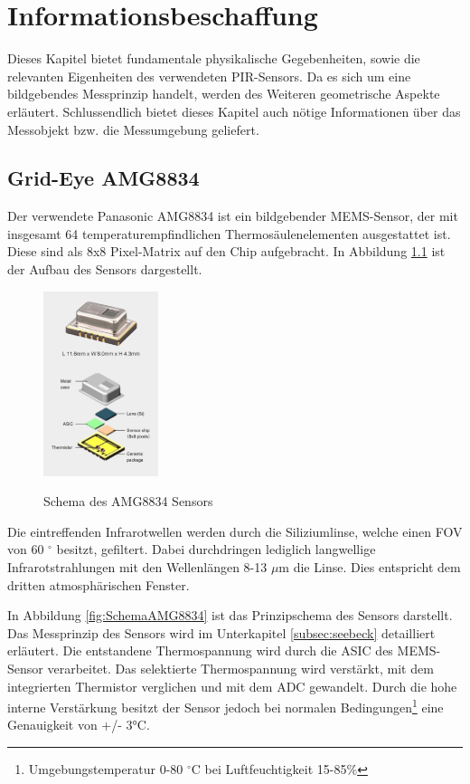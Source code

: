 \chapter{Informationsbeschaffung}
\label{chap:Informationsbeschaffung}
Dieses Kapitel bietet fundamentale physikalische Gegebenheiten, sowie die relevanten Eigenheiten des verwendeten \ac{PIR}-Sensors. Da es sich um eine bildgebendes Messprinzip handelt, werden des Weiteren geometrische Aspekte erläutert. Schlussendlich bietet dieses Kapitel auch nötige Informationen über das Messobjekt bzw. die Messumgebung geliefert.

\section{Grid-Eye AMG8834}

Der verwendete Panasonic AMG8834 ist ein bildgebender \ac{MEMS}-Sensor, der mit insgesamt 64 temperaturempfindlichen Thermosäulenelementen ausgestattet ist. Diese sind als 8x8 Pixel-Matrix auf den Chip aufgebracht. In Abbildung \ref{fig:Explosionsdarstellung} ist der Aufbau des Sensors dargestellt.
 
\begin{figure}[H]
	\centering
	\includegraphics[width=0.3\textwidth]
	{fig/grid_eye_aufbau.PNG}
	\caption[Schema des AMG8834 Sensors]{Schema des AMG8834 Sensors} \protect\cite{AMG8834}
	\label{fig:Explosionsdarstellung}
\end{figure}
Die eintreffenden Infrarotwellen werden durch die Siliziumlinse, welche einen \ac{FOV} von 60 $^\circ$ besitzt, gefiltert. Dabei durchdringen lediglich langwellige Infrarotstrahlungen mit den Wellenlängen 8-13 $\mu$m die Linse. Dies entspricht dem dritten atmosphärischen Fenster.

In Abbildung \ref{fig:SchemaAMG8834} ist das Prinzipschema des Sensors darstellt. Das Messprinzip des Sensors wird im Unterkapitel \ref{subsec:seebeck} detailliert erläutert. Die entstandene Thermospannung wird durch die \ac{ASIC} des \ac{MEMS}-Sensor verarbeitet. Das selektierte Thermospannung wird verstärkt, mit dem integrierten Thermistor verglichen und mit dem \ac{ADC} gewandelt. Durch die hohe interne Verstärkung besitzt der Sensor jedoch bei normalen Bedingungen\footnote[2]{Umgebungstemperatur 0-80 $^\circ$C bei Luftfeuchtigkeit 15-85\%} eine Genauigkeit von +/- 3°C. 

